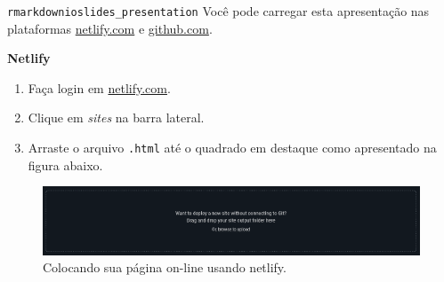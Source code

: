 \documentclass[
  10pt,
  ignorenonframetext,
]{beamer}
\providecommand{\tightlist}{%
  \setlength{\itemsep}{0pt}\setlength{\parskip}{0pt}}\usepackage{longtable,booktabs,array}
\begin{document}
\begin{frame}[fragile]{\texttt{rmarkdown}\newline \texttt{ioslides\_presentation}}
\protect\hypertarget{rmarkdownioslides_presentation-11}{}
Você pode carregar esta apresentação nas plataformas
\href{https://www.netlify.com/}{netlify.com} e
\href{https://github.com/}{github.com}.

\textbf{Netlify}

\begin{enumerate}
\tightlist
\item
  Faça login em \href{https://www.netlify.com/}{netlify.com}.
\item
  Clique em \emph{sites} na barra lateral.
\item
  Arraste o arquivo \texttt{.html} até o quadrado em destaque como
  apresentado na figura abaixo.
\end{enumerate}

\begin{figure}

{\centering \includegraphics[width=1.05\textwidth,height=\textheight]{figuras/netlify-dropdown.png}

}

\caption{Colocando sua página on-line usando netlify.}

\end{figure}
\end{frame}
\end{document}
